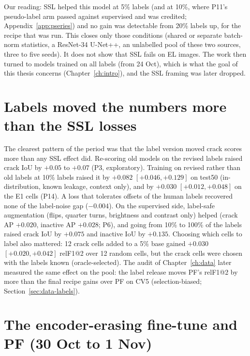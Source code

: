 Our reading: SSL helped this model at 5\% labels (and at 10\%, where P11's pseudo-label arm passed against supervised and was credited;
Appendix~\ref{app:pseries}) and no gain was detectable from 20\% labels up, for the recipe that was run. This
closes only those conditions (shared or separate batch-norm statistics, a ResNet-34 U-Net++, an unlabelled pool of these two
sources, three to five seeds). It does not show that SSL fails on EL images. The work then turned to models trained on all labels (from 24 Oct),
which is what the goal of this thesis concerns (Chapter~\ref{ch:intro}), and the SSL framing was later dropped.

\section{Labels moved the numbers more than the SSL losses}\label{sec:legacy-labels}

The clearest pattern of the period was that the label version moved crack scores more than any SSL effect did. Re-scoring old models on
the revised labels raised crack IoU by $+0.05$ to $+0.07$ (P3, exploratory). Training on revised rather than old labels at 10\%
labels raised it by $+0.082$ $[+0.046, +0.129]$ on test50 (in-distribution, known leakage, context only), and by $+0.030$ $[+0.012, +0.048]$ on the E1 cells (P14). A loss that tolerates
offsets of the human labels recovered none of the label-noise gap ($-0.004$). On the supervised side, label-safe augmentation (flips,
quarter turns, brightness and contrast only) helped (crack AP $+0.020$, inactive AP $+0.028$; P6), and going from 10\% to 100\% of
the labels raised crack IoU by $+0.075$ and inactive IoU by $+0.135$. Choosing which cells to label also mattered: 12 crack cells
added to a 5\% base gained $+0.030$ $[+0.020, +0.042]$ relF1@2 over 12 random cells, but the crack cells were chosen with the labels
known (oracle-selected). The audit of Chapter~\ref{ch:data} later measured the same effect on the pool: the label release moves PF's
relF1@2 by more than the final recipe gains over PF on CV5 (selection-biased; Section~\ref{sec:data-labels}).

\section{The encoder-erasing fine-tune and PF (30 Oct to 1 Nov)}\label{sec:legacy-pf}

